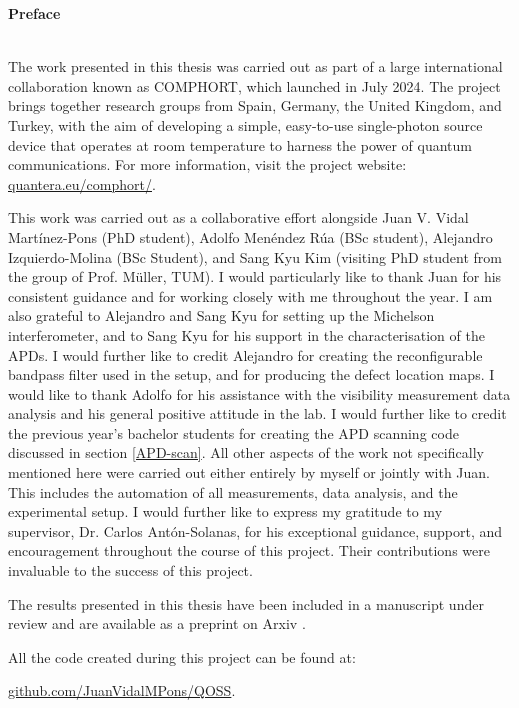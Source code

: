 \begin{center}
    \Large{\textbf{Preface}} \\
\end{center}
~\\[0.5 cm]


The work presented in this thesis was carried out as part of a large international collaboration known as COMPHORT, which launched in July 2024. The project brings together research groups from Spain, Germany, the United Kingdom, and Turkey, with the aim of developing a simple, easy-to-use single-photon source device that operates at room temperature to harness the power of quantum communications. For more information, visit the project website: \href{https://quantera.eu/comphort/}{quantera.eu/comphort/}.

This work was carried out as a collaborative effort alongside Juan V. Vidal Martínez-Pons (PhD student), Adolfo Menéndez Rúa (BSc student), Alejandro Izquierdo-Molina (BSc Student), and Sang Kyu Kim (visiting PhD student from the group of Prof. M\"uller, TUM). I would particularly like to thank Juan for his consistent guidance and for working closely with me throughout the year. I am also grateful to Alejandro and Sang Kyu for setting up the Michelson interferometer, and to Sang Kyu for his support in the characterisation of the APDs. I would further like to credit Alejandro for creating the reconfigurable bandpass filter used in the setup, and for producing the defect location maps. I would like to thank Adolfo for his assistance with the visibility measurement data analysis and his general positive attitude in the lab. I would further like to credit the previous year's bachelor students for creating the APD scanning code discussed in section \ref{APD-scan}. All other aspects of the work not specifically mentioned here were carried out either entirely by myself or jointly with Juan. This includes the automation of all measurements, data analysis, and the experimental setup. I would further like to express my gratitude to my supervisor, Dr. Carlos Antón-Solanas, for his exceptional guidance, support, and encouragement throughout the course of this project. Their contributions were invaluable to the success of this project.

The results presented in this thesis have been included in a manuscript under review and are available as a preprint on Arxiv \cite{Martinez-Pons2025}.

All the code created during this project can be found at:

\href{https://github.com/JuanVidalMPons/QOSS}{github.com/JuanVidalMPons/QOSS}. 


\newpage